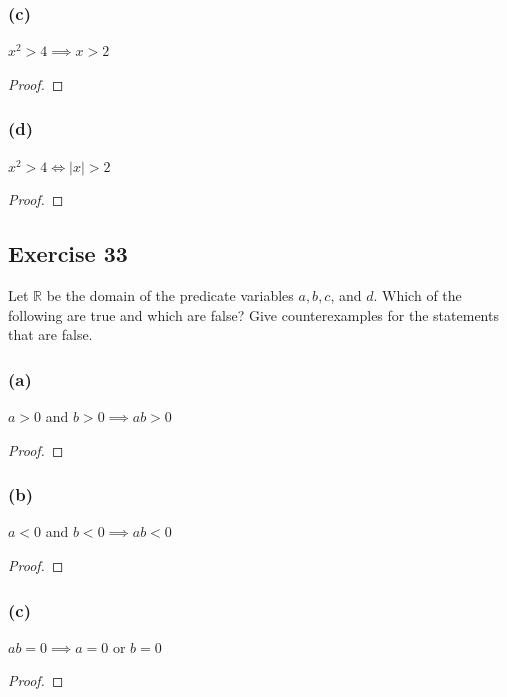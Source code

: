 \documentclass[14pt]{extarticle}
\newcommand{\R}{\mathbb{R}}
\begin{document}
\subsubsection{(c)}
$x^2 > 4 \implies x > 2$

\begin{proof}

\end{proof}

\subsubsection{(d)}
$x^2 > 4 \iff |x| > 2$

\begin{proof}

\end{proof}

\subsection{Exercise 33}
Let $\R$ be the domain of the predicate variables $a, b, c$, and $d$. Which of the following are true and which are false? Give counterexamples for the statements that are false.

\subsubsection{(a)}
$a > 0$ and $b > 0 \implies ab > 0$

\begin{proof}

\end{proof}

\subsubsection{(b)}
$a < 0$ and $b < 0 \implies ab < 0$

\begin{proof}

\end{proof}

\subsubsection{(c)}
$ab = 0 \implies a = 0$ or $b = 0$

\begin{proof}

\end{proof}
\end{document}
